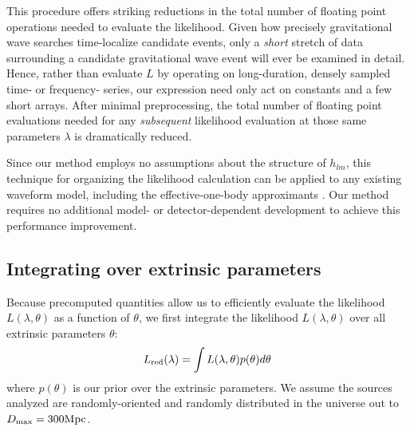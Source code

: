 \documentclass[twocolumn,prd,nofootinbib]{revtex4}
\newcommand\unit[1]{{\rm #1}}
\begin{document}
This procedure offers striking reductions in the total number of floating point operations needed to evaluate the
likelihood.
Given how precisely gravitational wave searches time-localize candidate events, only a \emph{short} stretch of data
surrounding a candidate gravitational wave event will ever be examined in  detail.  Hence, rather than evaluate $L$ by operating on long-duration, densely sampled
time- or frequency- series, our expression need only act on constants and a few short arrays.  After minimal preprocessing, the total number of
floating point evaluations needed for any \emph{subsequent} likelihood evaluation at those same parameters $\lambda$ is
dramatically reduced.  

%
Since our method employs no assumptions about the structure of $h_{lm}$, this technique for organizing the likelihood
calculation can be applied to any existing waveform model, including the effective-one-body approximants
\cite{gw-astro-EOBspin-Tarrachini2012,gw-astro-EOBNR-Calibrated-2009}.  
Our method requires no  additional model- or detector-dependent development  to achieve this performance improvement.  


\subsection{Integrating over extrinsic parameters}

Because precomputed quantities allow us to efficiently evaluate the likelihood $L(\lambda,\theta)$ as a function of
$\theta$, we first integrate the likelihood $L(\lambda,\theta)$ over all extrinsic parameters $\theta$:
\begin{eqnarray}
L_{\rm red}(\lambda) = \int L(\lambda,\theta) p(\theta) d\theta
\end{eqnarray}
where $p(\theta)$ is our prior over the extrinsic  parameters.  We assume the sources analyzed are randomly-oriented and
randomly distributed in the universe out to $D_{\rm max}=300 \unit{Mpc}$.  
\end{document}
